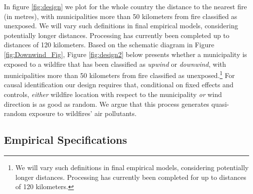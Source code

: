 \documentclass[11pt]{article}
\begin{document}
\begin{spacing}{1.3}
 In figure \ref{fig:design} we plot for the whole country the distance to the nearest fire (in metres), with municipalities more than 50 kilometers from fire classified as unexposed. We will vary such definitions in final empirical models, considering potentially longer distances.  Processing has currently been completed up to distances of 120 kilometers.  
Based on the schematic diagram in Figure \ref{fig:Downwind_Fig}, Figure \ref{fig:design2} below presents whether a municipality is exposed to a wildfire that has been classified as \textit{upwind} or \textit{downwind}, with municipalities more than 50 kilometers from fire classified as unexposed.\footnote{We will vary such definitions in final empirical models, considering potentially longer distances.  Processing has currently been completed for up to distances of 120 kilometers.} For causal identification our design requires that, conditional on fixed effects and controls, \emph{either} wildfire location with respect to the municipality \emph{or} wind direction is as good as random. We argue that this process generates quasi-random exposure to wildfires' air pollutants.


\subsection{Empirical Specifications}
\label{sscn:empirics}




\end{spacing}
\end{document}
